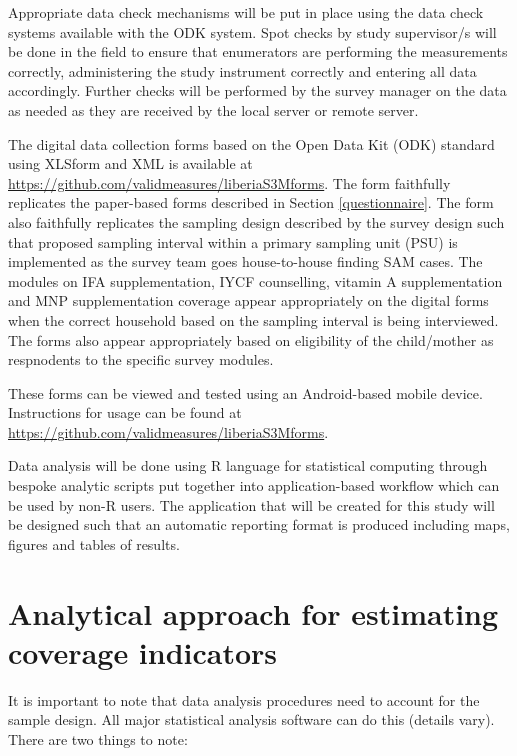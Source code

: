 \documentclass[12pt,a4paper]{book}
\theoremstyle{definition}
\theoremstyle{definition}
\theoremstyle{definition}
\theoremstyle{remark}
\begin{document}
Appropriate data check mechanisms will be put in place using the data
check systems available with the ODK system. Spot checks by study
supervisor/s will be done in the field to ensure that enumerators are
performing the measurements correctly, administering the study
instrument correctly and entering all data accordingly. Further checks
will be performed by the survey manager on the data as needed as they
are received by the local server or remote server.

The digital data collection forms based on the Open Data Kit (ODK)
standard using XLSform and XML is available at
\url{https://github.com/validmeasures/liberiaS3Mforms}. The form
faithfully replicates the paper-based forms described in Section
\ref{questionnaire}. The form also faithfully replicates the sampling
design described by the survey design such that proposed sampling
interval within a primary sampling unit (PSU) is implemented as the
survey team goes house-to-house finding SAM cases. The modules on IFA
supplementation, IYCF counselling, vitamin A supplementation and MNP
supplementation coverage appear appropriately on the digital forms when
the correct household based on the sampling interval is being
interviewed. The forms also appear appropriately based on eligibility of
the child/mother as respnodents to the specific survey modules.

These forms can be viewed and tested using an Android-based mobile
device. Instructions for usage can be found at
\url{https://github.com/validmeasures/liberiaS3Mforms}.

Data analysis will be done using R language for statistical computing
\citep{R:2018} through bespoke analytic scripts put together into
application-based workflow which can be used by non-R users. The
application that will be created for this study will be designed such
that an automatic reporting format is produced including maps, figures
and tables of results.

\hypertarget{analytical-approach-for-estimating-coverage-indicators}{%
\section{Analytical approach for estimating coverage
indicators}\label{analytical-approach-for-estimating-coverage-indicators}}

It is important to note that data analysis procedures need to account
for the sample design. All major statistical analysis software can do
this (details vary). There are two things to note:
\end{document}
